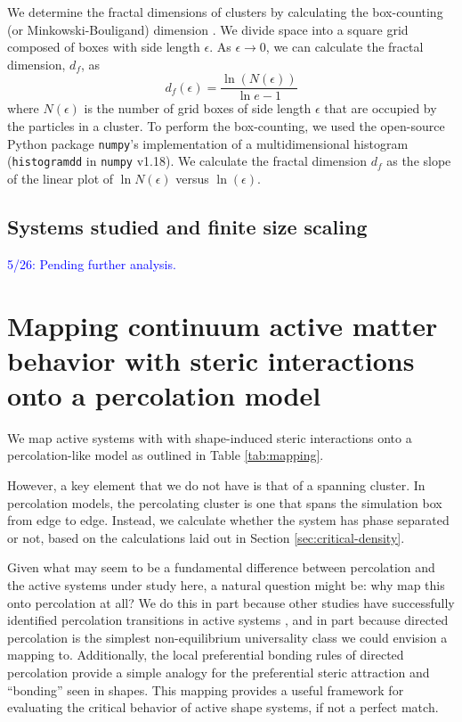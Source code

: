 We determine the fractal dimensions of clusters by calculating the box-counting (or Minkowski-Bouligand) dimension \cite{Schroeder_1991}.
We divide space into a square grid composed of boxes with side length $\epsilon$. As $\epsilon\rightarrow{0}$, we can calculate the fractal dimension, $d_f$, as
\begin{equation}
d_f(\epsilon) = \frac{\ln(N(\epsilon))}{\ln{e}-1}
\end{equation}
where $N(\epsilon)$ is the number of grid boxes of side length $\epsilon$ that are occupied by the particles in a cluster.
To perform the box-counting, we used the open-source Python package \verb|numpy|'s implementation of a multidimensional histogram (\verb|histogramdd| in \verb|numpy| v1.18)\cite{numpy}.
We calculate the fractal dimension $d_f$ as the slope of the linear plot of $\ln{N(\epsilon)}$ versus $\ln(\epsilon)$.


\subsection{Systems studied and finite size scaling}
\textcolor{blue}{5/26: Pending further analysis.}


\section{Mapping continuum active matter behavior with steric interactions onto a percolation model}

We map active systems with with shape-induced steric interactions onto a percolation-like model as outlined in Table \ref{tab:mapping}.

However, a key element that we do not have is that of a spanning cluster.
In percolation models, the percolating cluster is one that spans the simulation box from edge to edge.
Instead, we calculate whether the system has phase separated or not, based on the calculations laid out in Section \ref{sec:critical-density}.

Given what may seem to be a fundamental difference between percolation and the active systems under study here, a natural question might be: why map this onto percolation at all?
We do this in part because other studies have successfully identified percolation transitions in active systems \cite{Flock_percolation_2019,citation_needed}, and in part because directed percolation is the simplest non-equilibrium universality class we could envision a mapping to\cite{percolation_book,citation_needed}.
Additionally, the local preferential bonding rules of directed percolation provide a simple analogy for the preferential steric attraction and ``bonding'' seen in shapes.
This mapping provides a useful framework for evaluating the critical behavior of active shape systems, if not a perfect match.

